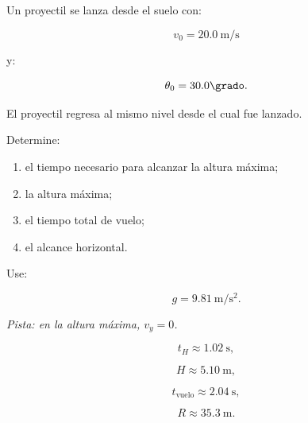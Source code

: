 \begin{ejercicio}
Un proyectil se lanza desde el suelo con:

\[
v_0=\SI{20.0}{\meter\per\second}
\]

y:

\[
\theta_0=30.0\grado.
\]

El proyectil regresa al mismo nivel desde el cual fue lanzado.

Determine:

\begin{enumerate}[label=\alph*)]
    \item el tiempo necesario para alcanzar la altura máxima;
    \item la altura máxima;
    \item el tiempo total de vuelo;
    \item el alcance horizontal.
\end{enumerate}

Use:

\[
g=\SI{9.81}{\meter\per\second\squared}.
\]

\textit{Pista: en la altura máxima, \(v_y=0\).}
\end{ejercicio}

\begin{respuesta}
\[
t_H\approx\SI{1.02}{\second},
\]

\[
H\approx\SI{5.10}{\meter},
\]

\[
t_{\mathrm{vuelo}}\approx\SI{2.04}{\second},
\]

\[
\boxed{
R\approx\SI{35.3}{\meter}
}.
\]
\end{respuesta}

